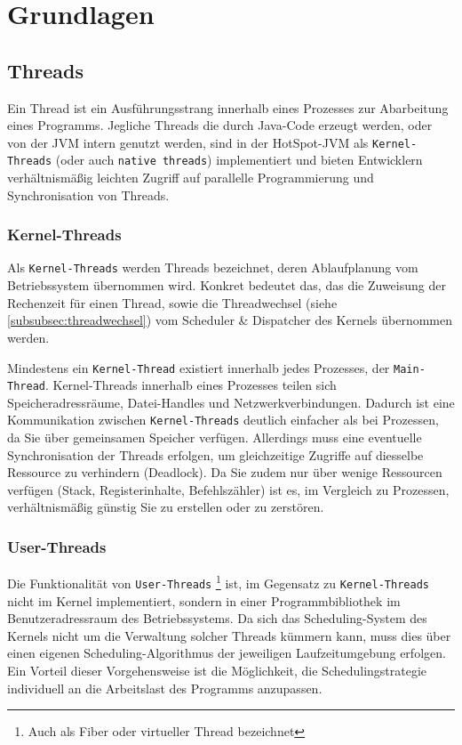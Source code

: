 \section{Grundlagen}
\label{sec:grundlagen}

\subsection{Threads}
\label{subsec:threads}
Ein Thread ist ein Ausführungsstrang innerhalb eines Prozesses zur Abarbeitung eines Programms.
Jegliche Threads die durch Java-Code erzeugt werden, oder von der JVM intern genutzt werden,
sind in der HotSpot-JVM als \verb|Kernel-Threads| (oder auch \verb|native threads|) implementiert
und bieten Entwicklern verhältnismäßig leichten Zugriff auf parallelle Programmierung und Synchronisation von Threads.
\parencite[Absatz Thread Management]{OpenJDKHotspotOverview}

\subsubsection{Kernel-Threads}
\label{subsubsec:kernel-threads}
Als \verb|Kernel-Threads| werden Threads bezeichnet, deren Ablaufplanung vom Betriebssystem übernommen wird.
Konkret bedeutet das, das die Zuweisung der Rechenzeit für einen Thread, sowie die Threadwechsel (siehe \ref{subsubsec:threadwechsel})
vom Scheduler \& Dispatcher des Kernels übernommen werden.

Mindestens ein \verb|Kernel-Thread| existiert innerhalb jedes Prozesses, der \verb|Main-Thread|. Kernel-Threads innerhalb eines Prozesses
teilen sich Speicheradressräume, Datei-Handles und Netzwerkverbindungen. Dadurch ist eine Kommunikation zwischen \verb|Kernel-Threads| deutlich
einfacher als bei Prozessen, da Sie über gemeinsamen Speicher verfügen. Allerdings muss eine eventuelle Synchronisation der Threads erfolgen, um
gleichzeitige Zugriffe auf diesselbe Ressource zu verhindern (Deadlock).
Da Sie zudem nur über wenige Ressourcen verfügen (Stack, Registerinhalte, Befehlszähler) ist es, im Vergleich zu Prozessen,
verhältnismäßig günstig Sie zu erstellen oder zu zerstören. \parencite[Kapitel 2.2.5]{Tanenbaum2016}\parencite{Brosenne2021}

\subsubsection{User-Threads}
\label{subsubsec:user-threads}
Die Funktionalität von \verb|User-Threads| \footnote{Auch als Fiber oder virtueller Thread bezeichnet} ist, im Gegensatz zu \verb|Kernel-Threads|
nicht im Kernel implementiert, sondern in einer Programmbibliothek im Benutzeradressraum des Betriebssystems.
Da sich das Scheduling-System des Kernels nicht um die Verwaltung solcher Threads kümmern kann, muss dies über einen eigenen Scheduling-Algorithmus
der jeweiligen Laufzeitumgebung erfolgen.
Ein Vorteil dieser Vorgehensweise ist die Möglichkeit, die Schedulingstrategie individuell an die Arbeitslast des Programms anzupassen.

